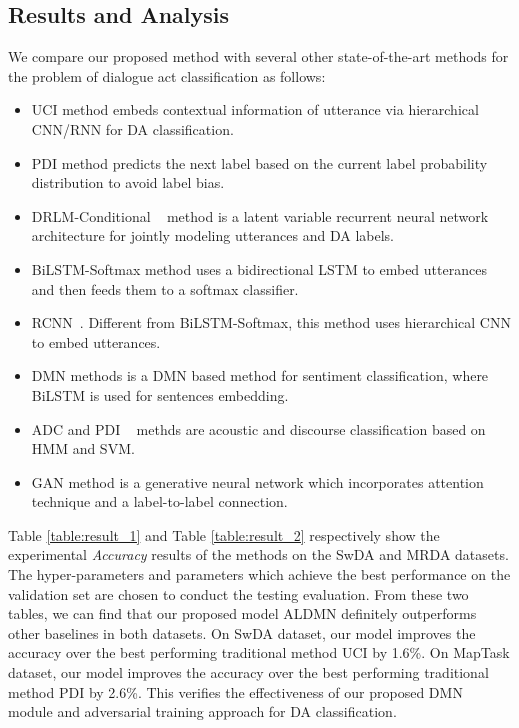 \documentclass[conference]{IEEEtran}
\begin{document}
	\subsection{ Results and Analysis}
	We compare our proposed method with several other state-of-the-art methods for the problem of dialogue act classification as follows:
	\begin{itemize}
		\item UCI \cite{liu2017using} method embeds contextual information of utterance via hierarchical CNN/RNN for DA classification.
		\item PDI \cite{tran2017aprocessings} method predicts the next label based on the current label probability distribution to avoid label bias.
		\item DRLM-Conditional ~\cite{ji2016a} method is a latent variable recurrent neural network architecture for jointly modeling utterances and DA labels.
		\item BiLSTM-Softmax \cite{khanpour2016dialogue} method uses a bidirectional LSTM to embed utterances and then feeds them to a softmax classifier.
		\item RCNN~\cite{kalchbrenner2013recurrent}. Different from BiLSTM-Softmax, this method uses hierarchical CNN to embed  utterances.
		\item DMN \cite{kumar2016ask} methods is a DMN based method for sentiment classification, where BiLSTM is used for sentences embedding.\item ADC \cite{julia2010dialog} and PDI ~\cite{tran2017aprocessings} methds are acoustic and discourse classification based on HMM and SVM.
\item GAN \cite{tran2017bgenerative} method is a generative neural network which incorporates attention technique and a label-to-label connection.
	\end{itemize}
	Table \ref{table:result_1} and Table \ref{table:result_2} respectively show the experimental \textit{Accuracy} results of the methods on the SwDA and MRDA datasets. The hyper-parameters and parameters which achieve the best performance on the validation set are chosen to conduct the testing evaluation. From these two tables, we can find that our proposed model ALDMN definitely outperforms other baselines in both datasets. On SwDA dataset, our model improves the accuracy over the best performing traditional method UCI by 1.6\%. On MapTask dataset, our model improves the accuracy over the best performing traditional method PDI by 2.6\%. This verifies the effectiveness of our proposed DMN module and adversarial training approach for DA classification.
\end{document}
